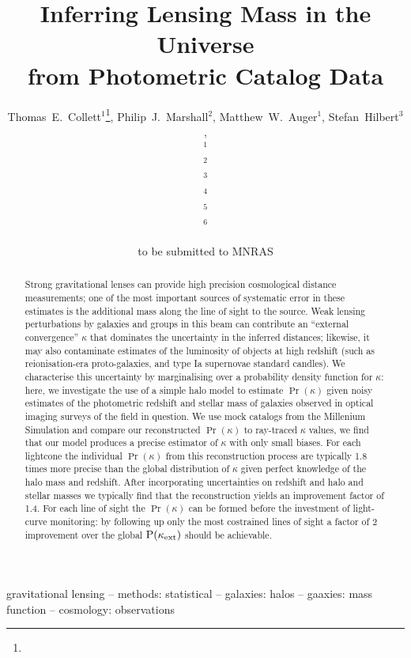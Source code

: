 \documentclass[useAMS,usenatbib]{mn2e}
\title[Line of Sight Mass Reconstruction]
{Inferring Lensing Mass in the Universe \\
from Photometric Catalog Data}
\author[Collett \etal]{%
  Thomas~E.~Collett$^{1}$\thanks{\collettemail},
  Philip~J.~Marshall$^{2}$,
  Matthew~W.~Auger$^{1}$,
  Stefan~Hilbert$^{3}$,
\newauthor{%
  Sherry~H.~Suyu$^{4}$,
  Zachary~Greene$^{4}$,
  Tommaso~Treu$^{4}$\thanks{\packard},
  Christopher~D.~Fassnacht$^{5}$,}
\newauthor{%
  L\`eon~V.~E.~Koopmans$^{6}$,
  Roger~D.~Blandford$^{3}$} 
  \medskip\\
  $^1$\ioa\\
  $^2$\oxford\\
  $^3$\kipac\\
  $^4$\ucsb\\
  $^5$\davis\\
  $^6$\kapteyn
}
\begin{document}
             
\date{to be submitted to MNRAS}
\pagerange{\pageref{firstpage}--\pageref{lastpage}}

\maketitle           

\label{firstpage}


\begin{abstract} 
Strong gravitational lenses can provide high precision cosmological distance
measurements; one of the most important sources of systematic error in these
estimates is the additional mass along the line of sight to the source. Weak
lensing perturbations by galaxies and groups in this beam can contribute an ``external
convergence'' $\kappa$ that dominates the  uncertainty in the inferred
distances; likewise, it may also contaminate estimates of the luminosity of
objects at high redshift (such as reionisation-era proto-galaxies, and type Ia
supernovae standard candles).  We characterise this uncertainty by marginalising
over a probability density function for $\kappa$: here, we investigate the use
of a simple halo model to estimate $\Pr(\kappa)$ given noisy estimates of the
photometric redshift and stellar mass of galaxies observed in optical imaging
surveys of the field in question. We use mock catalogs from the Millenium
Simulation and compare our reconstructed $\Pr(\kappa)$ to ray-traced $\kappa$ values,
we find that our model produces a precise estimator of $\kappa$ with only small biases.
For each lightcone the individual $\Pr(\kappa)$ from this reconstruction process are
typically 1.8 times more precise than the global distribution of $\kappa$ given perfect knowledge 
of the halo mass and redshift. After incorporating uncertainties on redshift and halo and stellar masses
we typically find that the reconstruction yields an improvement factor of 1.4. For each line of sight the
 $\Pr(\kappa)$ can be formed before the investment of light-curve monitoring: by following up only the 
most costrained lines of sight a factor of 2 improvement over the global ${\rm P}(\kappa_{\rm ext})$ should be 
achievable.
\end{abstract}


\begin{keywords}
  gravitational lensing   --
  methods: statistical    --
  galaxies: halos         --
  gaaxies: mass function  --
  cosmology: observations
\end{keywords}
\end{document}
